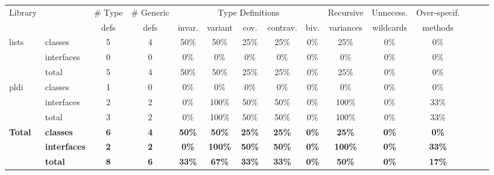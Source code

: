 \begin{tabular}{|ll|c|c|c|c|c|c|c|c|c|c|c|c|c|} \hline
Library & & \# Type     & \# Generic  & \multicolumn{5}{c|}{Type Definitions} & Recursive & Unnecess. & Over-specif.\\
        & & defs & defs & invar. & variant & cov. & contrav. & biv. & variances & wildcards   & methods  \\
\hline
\multirow{3}{*}{lists} & classes & 5 & 4 & 50\% & 50\% & 25\% & 25\% & 0\% & 25\% & 0\% & 0\% \\ 
 & interfaces & 0 & 0 & 0\% & 0\% & 0\% & 0\% & 0\% & 0\% & 0\% & 0\% \\ 
 & total & 5 & 4 & 50\% & 50\% & 25\% & 25\% & 0\% & 25\% & 0\% & 0\% \\ 
\hline 
\multirow{3}{*}{pldi} & classes & 1 & 0 & 0\% & 0\% & 0\% & 0\% & 0\% & 0\% & 0\% & 0\% \\ 
 & interfaces & 2 & 2 & 0\% & 100\% & 50\% & 50\% & 0\% & 100\% & 0\% & 33\% \\ 
 & total & 3 & 2 & 0\% & 100\% & 50\% & 50\% & 0\% & 100\% & 0\% & 33\% \\ 
\hline 
\multirow{3}{*}{\textbf{Total}} & \textbf{classes} &\textbf{6} & \textbf{4} & \textbf{50\%} & \textbf{50\%} & \textbf{25\%} & \textbf{25\%} & \textbf{0\%} & \textbf{25\%} & \textbf{0\%} & \textbf{0\%} \\ 
 & \textbf{interfaces} & \textbf{2} & \textbf{2} & \textbf{0\%} & \textbf{100\%} & \textbf{50\%} & \textbf{50\%} & \textbf{0\%} & \textbf{100\%} & \textbf{0\%} & \textbf{33\%} \\ 
 & \textbf{total} & \textbf{8} & \textbf{6} & \textbf{33\%} & \textbf{67\%} & \textbf{33\%} & \textbf{33\%} & \textbf{0\%} & \textbf{50\%} & \textbf{0\%} & \textbf{17\%} \\ 
\hline 
\end{tabular}

